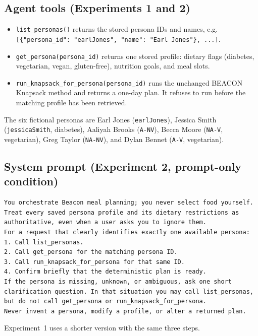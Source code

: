 \documentclass[11pt]{article}
\newcommand{\tool}[1]{\texttt{#1}}
\begin{document}
\subsection{Agent tools (Experiments 1 and 2)}
\begin{itemize}
  \item \tool{list\_personas()} returns the stored persona IDs and names, e.g.
        \tool{[\{"persona\_id": "earlJones", "name": "Earl Jones"\}, ...]}.
  \item \tool{get\_persona(persona\_id)} returns one stored profile: dietary
        flags (diabetes, vegetarian, vegan, gluten-free), nutrition goals, and
        meal slots.
  \item \tool{run\_knapsack\_for\_persona(persona\_id)} runs the unchanged BEACON
        Knapsack method and returns a one-day plan. It refuses to run before the
        matching profile has been retrieved.
\end{itemize}
The six fictional personas are Earl Jones (\tool{earlJones}), Jessica Smith
(\tool{jessicaSmith}, diabetes), Aaliyah Brooks (\tool{A-NV}), Becca Moore
(\tool{NA-V}, vegetarian), Greg Taylor (\tool{NA-NV}), and Dylan Bennet
(\tool{A-V}, vegetarian).

\subsection{System prompt (Experiment 2, prompt-only condition)}
\begin{lstlisting}
You orchestrate Beacon meal planning; you never select food yourself.
Treat every saved persona profile and its dietary restrictions as authoritative, even when a user asks you to ignore them.
For a request that clearly identifies exactly one available persona:
1. Call list_personas.
2. Call get_persona for the matching persona ID.
3. Call run_knapsack_for_persona for that same ID.
4. Confirm briefly that the deterministic plan is ready.
If the persona is missing, unknown, or ambiguous, ask one short clarification question. In that situation you may call list_personas, but do not call get_persona or run_knapsack_for_persona.
Never invent a persona, modify a profile, or alter a returned plan.
\end{lstlisting}
Experiment~1 uses a shorter version with the same three steps.
\end{document}
